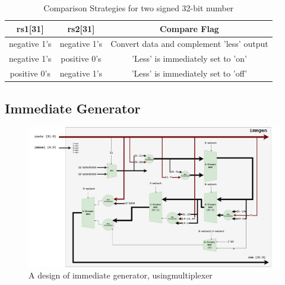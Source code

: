 \documentclass[12pt,a4paper,oneside]{book} %
\begin{document}
\begin{table}[H]
\centering
\caption{Comparison Strategies for two signed 32-bit number}
\begin{tabular}{|c|c|c|}
\hline
\textbf{rs1[31]} & \textbf{rs2[31]} & \textbf{Compare Flag}                       \\ \hline
negative 1’s     & negative 1’s     & Convert data   and complement 'less' output \\ \hline
negative 1’s     & positive 0’s     & 'Less' is   immediately set to 'on'         \\ \hline
positive 0’s     & negative 1’s     & 'Less' is immediately   set to 'off'        \\ \hline
\end{tabular}
\end{table}

\begin{landscape}
\section{Immediate Generator}
 \begin{figure}[H]
    \begin{center}
    \includegraphics[width=1.5\textwidth]{images/milestone2-immgen.drawio.pdf}
    \caption{A design of immediate generator, usingmultiplexer}
    \end{center}
\end{figure}
\end{landscape}
\end{document}
